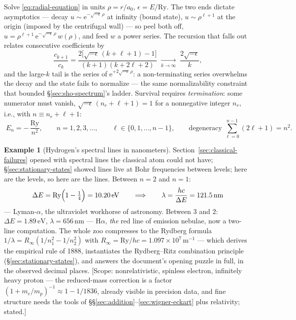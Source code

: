\documentclass[11pt]{article}
\theoremstyle{plain}
\theoremstyle{definition}
\newtheorem{example}[theorem]{Example}
\theoremstyle{remark}
\newcommand{\ee}{\mathrm{e}}
\begin{document}
Solve \eqref{eq:radial-equation} in units $\rho = r/a_0$,
$\epsilon = E/\mathrm{Ry}$. The two ends dictate asymptotics ---
decay $u \sim \ee^{-\sqrt{-\epsilon}\,\rho}$ at infinity (bound
state), $u \sim \rho^{\ell+1}$ at the origin (imposed by the
centrifugal wall) --- so peel both off, $u = \rho^{\ell+1}\,
\ee^{-\sqrt{-\epsilon}\,\rho}\, w(\rho)$, and feed $w$ a power
series. The recursion that falls out relates consecutive
coefficients by
\begin{equation}
  \frac{c_{k+1}}{c_k}
  = \frac{2\bigl[\sqrt{-\epsilon}\,(k + \ell + 1) - 1\bigr]}
         {(k + 1)(k + 2\ell + 2)}
  \;\xrightarrow[k \to \infty]{}\;
  \frac{2\sqrt{-\epsilon}}{k} ,
\end{equation}
and the large-$k$ tail is the series of
$\ee^{+2\sqrt{-\epsilon}\,\rho}$: a non-terminating series
overwhelms the decay and the state fails to normalize --- the same
normalizability constraint that bounded \S\ref{sec:sho-spectrum}'s
ladder. Survival
requires \emph{termination}: some numerator must vanish,
$\sqrt{-\epsilon}\,(n_r + \ell + 1) = 1$ for a nonnegative integer
$n_r$, i.e., with $n \equiv n_r + \ell + 1$:
\begin{equation}
  \boxed{\;
  E_n = -\,\frac{\mathrm{Ry}}{n^2},
  \qquad n = 1, 2, 3, \dots,
  \qquad
  \ell \in \{0, 1, \dots, n-1\},
  \qquad
  \text{degeneracy } \sum_{\ell=0}^{n-1}(2\ell + 1) = n^2 .
  \;}
  \label{eq:hydrogen-spectrum}
\end{equation}

\begin{example}[Hydrogen's spectral lines in nanometers]
\label{ex:hydrogen-lines}
Section~\ref{sec:classical-failures} opened with spectral lines the
classical atom could not have; \S\ref{sec:stationary-states} showed
lines live at Bohr frequencies between levels; here are the levels,
so here are the lines. Between $n = 2$ and $n = 1$:
\begin{equation}
  \Delta E = \mathrm{Ry}\Bigl(1 - \tfrac14\Bigr)
  = 10.20\,\mathrm{eV}
  \qquad\Longrightarrow\qquad
  \lambda = \frac{hc}{\Delta E} = 121.5\,\mathrm{nm}
\end{equation}
--- Lyman-$\alpha$, the ultraviolet workhorse of astronomy. Between
$3$ and $2$: $\Delta E = 1.89\,\mathrm{eV}$, $\lambda =
656\,\mathrm{nm}$ --- H$\alpha$, \emph{the} red line of emission
nebulae, now a two-line computation. The whole zoo compresses to
the Rydberg formula
$1/\lambda = R_\infty(1/n_1^2 - 1/n_2^2)$ with
$R_\infty = \mathrm{Ry}/hc = 1.097\times10^7\,\mathrm m^{-1}$ ---
which derives the empirical rule of 1888, instantiates the
Rydberg--Ritz combination principle
(\S\ref{sec:stationary-states}), and answers the
document's opening puzzle in full, in the observed decimal
places. [Scope: nonrelativistic, spinless
electron, infinitely heavy proton --- the reduced-mass correction
is a factor $(1 + m_e/m_p)^{-1} \approx 1 - 1/1836$, already
visible in precision data, and fine structure needs the tools of
\S\S\ref{sec:addition}--\ref{sec:wigner-eckart} plus relativity;
stated.]
\end{example}
\end{document}
